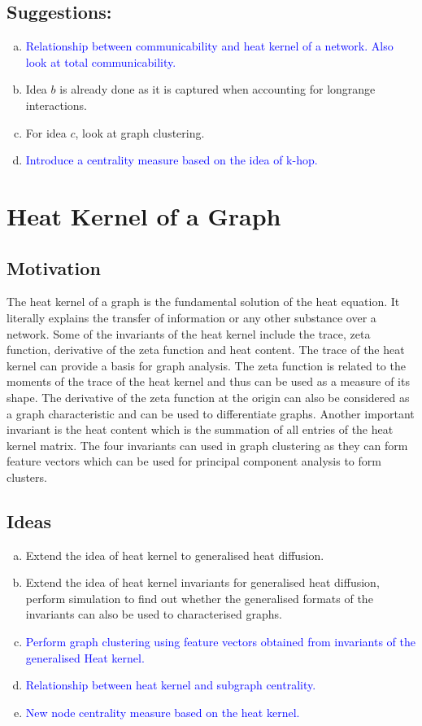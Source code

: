 \documentclass[10pt,a4paper]{article}
\begin{document}
	\subsection{Suggestions:}
	\begin{enumerate}[a)]
	\item \textcolor{blue}{Relationship between communicability and heat kernel of a network. Also look at total communicability.}
	\item Idea $b$ is already done as it is captured when accounting for longrange interactions.
	\item For idea $c$, look at graph clustering.
	\item \textcolor{blue}{Introduce a centrality measure based on the idea of k-hop.}
    \end{enumerate}
	
	\section{Heat Kernel of a Graph}
	\subsection{Motivation}
    The heat kernel of a graph is the fundamental solution of the heat equation. It literally explains the transfer of information or any other substance over a network. Some of the invariants of the heat kernel include the trace, zeta function, derivative of the zeta function and heat content. The trace of the heat kernel can provide a basis for graph analysis. The zeta function is related to the moments of the trace of the heat kernel and thus can be used as a measure of its shape. The derivative of the zeta function at the origin can also be considered as a graph characteristic and can be used to differentiate graphs. Another important invariant is the heat content which is the summation of all entries of the heat kernel matrix. The four invariants can used in graph clustering as they can form feature vectors which can be used for principal component analysis to form clusters.
	\subsection{Ideas}
	\begin{enumerate}[a)]
		\item Extend the idea of heat kernel to generalised heat diffusion.
		\item Extend the idea of heat kernel invariants for generalised heat diffusion, perform simulation to find out whether the generalised formats of the invariants can also be used to characterised graphs.
		\item \textcolor{blue}{Perform graph clustering using feature vectors obtained from invariants of the generalised Heat kernel.}
		\item \textcolor{blue}{Relationship between heat kernel and subgraph centrality.}
		\item \textcolor{blue}{New node centrality measure based on the heat kernel.}
	\end{enumerate}
\end{document}
